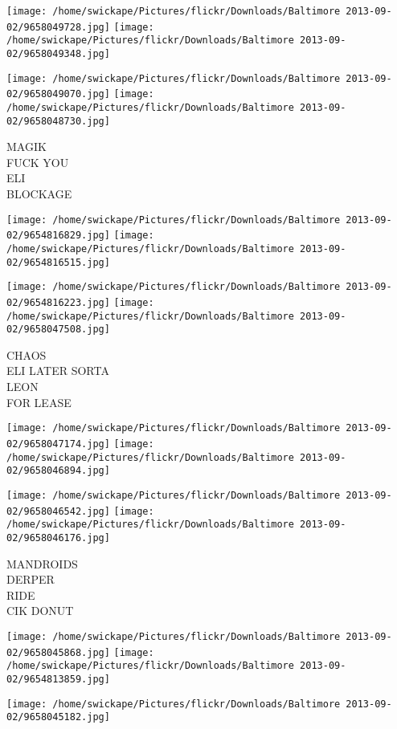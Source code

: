 \documentclass[10pt,letterpaper]{article}
\begin{document}
\texttt{[image: /home/swickape/Pictures/flickr/Downloads/Baltimore 2013-09-02/9658049728.jpg]}
\texttt{[image: /home/swickape/Pictures/flickr/Downloads/Baltimore 2013-09-02/9658049348.jpg]}

\texttt{[image: /home/swickape/Pictures/flickr/Downloads/Baltimore 2013-09-02/9658049070.jpg]}
\texttt{[image: /home/swickape/Pictures/flickr/Downloads/Baltimore 2013-09-02/9658048730.jpg]}

MAGIK\\
FUCK YOU\\
ELI\\
BLOCKAGE
\pagebreak

\texttt{[image: /home/swickape/Pictures/flickr/Downloads/Baltimore 2013-09-02/9654816829.jpg]}
\texttt{[image: /home/swickape/Pictures/flickr/Downloads/Baltimore 2013-09-02/9654816515.jpg]}

\texttt{[image: /home/swickape/Pictures/flickr/Downloads/Baltimore 2013-09-02/9654816223.jpg]}
\texttt{[image: /home/swickape/Pictures/flickr/Downloads/Baltimore 2013-09-02/9658047508.jpg]}

CHAOS\\
ELI LATER SORTA\\
LEON\\
FOR LEASE
\pagebreak

\texttt{[image: /home/swickape/Pictures/flickr/Downloads/Baltimore 2013-09-02/9658047174.jpg]}
\texttt{[image: /home/swickape/Pictures/flickr/Downloads/Baltimore 2013-09-02/9658046894.jpg]}

\texttt{[image: /home/swickape/Pictures/flickr/Downloads/Baltimore 2013-09-02/9658046542.jpg]}
\texttt{[image: /home/swickape/Pictures/flickr/Downloads/Baltimore 2013-09-02/9658046176.jpg]}

MANDROIDS\\
DERPER\\
RIDE\\
CIK DONUT
\pagebreak

\texttt{[image: /home/swickape/Pictures/flickr/Downloads/Baltimore 2013-09-02/9658045868.jpg]}
\texttt{[image: /home/swickape/Pictures/flickr/Downloads/Baltimore 2013-09-02/9654813859.jpg]}

\texttt{[image: /home/swickape/Pictures/flickr/Downloads/Baltimore 2013-09-02/9658045182.jpg]}
\end{document}
